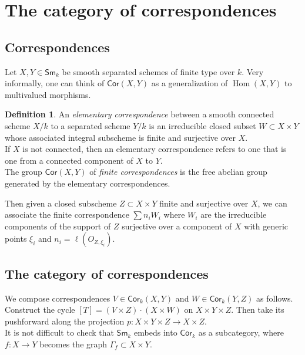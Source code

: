 \documentclass[leqno, openany]{memoir}
\theoremstyle{definition}
\newtheorem{defn}[thm]{Definition}
\theoremstyle{remark}
\theoremstyle{plain}
\theoremstyle{definition}
\theoremstyle{remark}
\newcommand{\Sm}{\mathsf{Sm}}
\newcommand{\Cor}{\mathsf{Cor}}
\DeclareMathOperator{\Hom}{Hom}
\begin{document}
\section{The category of correspondences} 
\subsection{Correspondences}
Let $X, Y\in \Sm_k$ be smooth separated schemes of finite type over $k$.  Very informally, one can think of $\Cor(X, Y)$ as a generalization of $\Hom(X, Y)$ to multivalued morphisms. 

\begin{defn}
An \textit{elementary correspondence} between a smooth connected scheme $X/k$ to a separated scheme $Y/k$ is an irreducible closed subset $W\subset X\times Y$ whose associated integral subscheme is finite and surjective over $X$. \\ 

If $X$ is not connected, then an elementary correspondence refers to one that is one from a connected component of $X$ to $Y$.   \\ 

The group $\Cor(X, Y)$ of \textit{finite correspondences} is the free abelian group generated by the elementary correspondences.
\end{defn} 

Then given a closed subscheme $Z\subset X\times Y$ finite and surjective over $X$, we can associate the finite correspondence $\sum n_iW_i$ where $W_i$ are the irreducible components of the support of $Z$ surjective over a component of $X$ with generic points $\xi_i$ and $n_i =\ell ( O_{Z, \xi_i} )$. \\ 

\subsection{The category of correspondences}

We compose correspondences $V\in\Cor_k(X, Y)$ and $W\in \Cor_k(Y, Z)$ as follows.  Construct the cycle $[T] = (V\times Z)\cdot (X\times W)$ on $X\times Y\times Z$.  Then take its pushforward along the projection $p:X\times Y\times Z\rightarrow X\times Z$. \\ 

It is not difficult to check that $\Sm_k$ embeds into $\Cor_k$ as a subcategory, where $f:X\rightarrow Y$ becomes the graph $\Gamma_f\subset X\times Y$. \\ 
\end{document}
